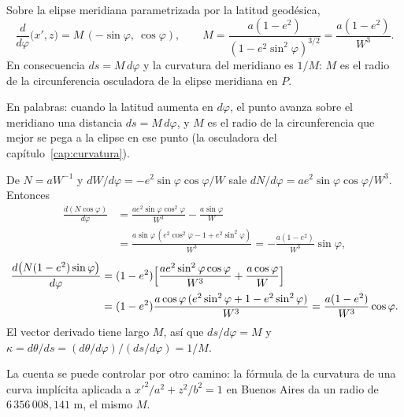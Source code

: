 \begin{proposicion}\label{prop:elip-M}
Sobre la elipse meridiana parametrizada por la latitud geodésica,
\[
  \frac{d}{d\varphi}\bigl(x',z\bigr)=M\,(-\sin\varphi,\ \cos\varphi),
  \qquad
  M=\frac{a(1-e^2)}{(1-e^2\sin^2\varphi)^{3/2}}=\frac{a(1-e^2)}{W^3}.
\]
En consecuencia \(ds=M\,d\varphi\) y la curvatura del meridiano es \(1/M\): \(M\) es el radio
de la circunferencia osculadora de la elipse meridiana en \(P\).
\end{proposicion}

En palabras: cuando la latitud aumenta en \(d\varphi\), el punto avanza sobre el meridiano una
distancia \(ds=M\,d\varphi\), y \(M\) es el radio de la circunferencia que mejor se pega a la
elipse en ese punto (la osculadora del capítulo~\ref{cap:curvatura}).

\begin{demostracion}
De \(N=aW^{-1}\) y \(dW/d\varphi=-e^2\sin\varphi\cos\varphi/W\) sale
\(dN/d\varphi=ae^2\sin\varphi\cos\varphi/W^3\). Entonces
\[
\begin{aligned}
  \frac{d(N\cos\varphi)}{d\varphi}
  &=\frac{ae^2\sin\varphi\cos^2\varphi}{W^3}-\frac{a\sin\varphi}{W}\\
  &=\frac{a\sin\varphi\,(e^2\cos^2\varphi-1+e^2\sin^2\varphi)}{W^3}
  =-\frac{a(1-e^2)}{W^3}\sin\varphi ,
\end{aligned}
\]
\[
\begin{aligned}
  \frac{d\bigl(N(1-e^2)\sin\varphi\bigr)}{d\varphi}
  &=(1-e^2)\Bigl[\frac{ae^2\sin^2\varphi\cos\varphi}{W^3}+\frac{a\cos\varphi}{W}\Bigr]\\
  &=(1-e^2)\frac{a\cos\varphi\,(e^2\sin^2\varphi+1-e^2\sin^2\varphi)}{W^3}
  =\frac{a(1-e^2)}{W^3}\cos\varphi .
\end{aligned}
\]
El vector derivado tiene largo \(M\), así que \(ds/d\varphi=M\) y
\(\kappa=d\theta/ds=(d\theta/d\varphi)/(ds/d\varphi)=1/M\).
\end{demostracion}

La cuenta se puede controlar por otro camino: la fórmula de la curvatura de una curva
implícita aplicada a \(x'^2/a^2+z^2/b^2=1\) en Buenos Aires da un radio de
\(6\,356\,008{,}141\) m, el mismo \(M\).

